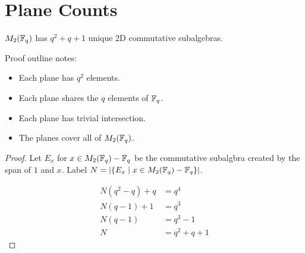 \documentclass{amsart}
\begin{document}
\section{Plane Counts}

\begin{theorem}\label{total-count}
    $M_2(\protect\mathbb{F}_q)$ has $q^2 + q + 1$ unique 2D commutative subalgebras.
\end{theorem}

Proof outline notes:
\begin{itemize}
    \item Each plane has $q^2$ elements.
    \item Each plane shares the $q$ elements of $\protect\mathbb{F}_q$.
    \item Each plane has trivial intersection.
    \item The planes cover all of $M_2(\protect\mathbb{F}_q)$.
\end{itemize}

\begin{proof}
    Let $E_x$ for $x \in M_2(\protect\mathbb{F}_q) - \protect\mathbb{F}_q$ be the commutative subalgbra created by the span of $1$ and $x$.
    Label $N = |\{E_x \mid x \in M_2(\protect\mathbb{F}_q) - \protect\mathbb{F}_q \}|$.


    \begin{align*}
        N(q^2 - q) + q &= q^4 \\
        N(q-1) + 1 &= q^3 \\
        N(q-1) &= q^3 - 1 \\
        N &= q^2 + q + 1
    \end{align*}
    
    \end{proof} 
\end{document}
